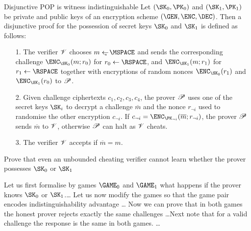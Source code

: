 \documentclass{crypto-exercise}
\author{Sven Laur}
\begin{document}
\begin{exercise}{Disjunctive POP is witness indistinguishable}
Let $(\SK_0, \PK_0)$ and $(\SK_1, \PK_1)$ be private and public keys of an encryption scheme $(\GEN,\ENC,\DEC)$. 
Then a disjunctive proof for the possession of secret keys $\SK_0$ and $\SK_1$ is defined as follows:
\begin{enumerate}
  \item[1.] The verifier $\mathscr{V}$ chooses $m\getsu\MSPACE$ and
    sends the corresponding challenge $\ENC_{\SK_0}(m;r_0)$ for
    $r_0\gets\RSPACE$, and $\ENC_{\SK_1}(m;r_1)$ for $r_1\gets\RSPACE$
    together with encryptions of random nonces $\ENC_{\SK_0}(r_1)$ and
    $\ENC_{\SK_1}(r_0)$ to $\mathscr{P}$.
  \item[2.]  Given challenge ciphertexts $c_1,c_2,c_3,c_4$, the prover
    $\mathscr{P}$ uses one of the secret keys $\SK_i$ to decrypt a
    challenge $\overline{m}$ and the nonce $r_{\neg i}$ used to
    randomise the other encryption $c_{\neg i}$. If $c_{\neg i}=
    \ENC_{\PK_{\neg i}}(\overline{m};r_{\neg i})$, the prover
    $\mathscr{P}$ sends $\overline{m}$ to $\mathscr{V}$, otherwise $\mathscr{P}$
    can halt as $\mathscr{V}$ cheats.
  \item[3.] The verifier $\mathscr{V}$ accepts if $\overline{m}=m$.
\end{enumerate}
Prove that even an unbounded cheating verifier cannot learn whether the prover possesses $\SK_0$ or $\SK_1$  
\end{exercise}
\begin{solution}
Let us first formalise by games $\GAME_0$ and $\GAME_1$ what happens if the prover knows $\SK_0$ or $\SK_1$.\ldots 
Let us now modify the games so that the game pair encodes indistinguishability advantage \ldots
Now we can prove that in both games the honest prover rejects exactly the same challenges \ldots Next note that for a valid challenge the response is the same in both games. \ldots




\end{solution}
\end{document}
